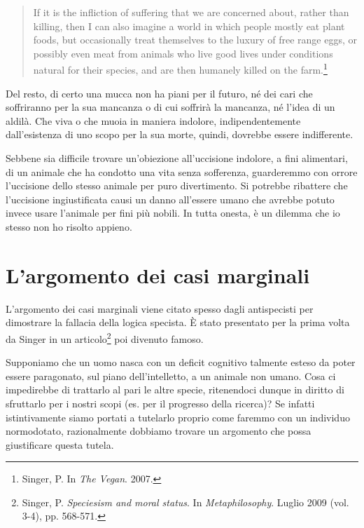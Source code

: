 \documentclass[a4paper,11pt,oneside,article]{memoir}
\begin{document}
\begin{quote}

If it is the infliction of suffering that we are concerned about, rather than
killing, then I can also imagine a world in which people mostly eat plant foods,
but occasionally treat themselves to the luxury of free range eggs, or possibly
even meat from animals who live good lives under conditions natural for their
species, and are then humanely killed on the farm.\footnote{Singer, P. In
\emph{The Vegan}. 2007.}

\end{quote}

Del resto, di certo una mucca non ha piani per il futuro, né dei cari che
soffriranno per la sua mancanza o di cui soffrirà la mancanza, né l'idea di un
aldilà. Che viva o che muoia in maniera indolore, indipendentemente
dall'esistenza di uno scopo per la sua morte, quindi, dovrebbe essere
indifferente.

Sebbene sia difficile trovare un'obiezione all'uccisione indolore, a fini
alimentari, di un animale che ha condotto una vita senza sofferenza, guarderemmo
con orrore l'uccisione dello stesso animale per puro divertimento. Si potrebbe
ribattere che l'uccisione ingiustificata causi un danno all'essere umano che
avrebbe potuto invece usare l'animale per fini più nobili. In tutta onesta, è un
dilemma che io stesso non ho risolto appieno.

\section{L'argomento dei casi marginali}

L'argomento dei casi marginali viene citato spesso dagli antispecisti per
dimostrare la fallacia della logica specista. È stato presentato per la prima
volta da Singer in un articolo\footnote{Singer, P. \emph{Speciesism and moral
status}. In \emph{Metaphilosophy}. Luglio 2009 (vol. 3-4), pp. 568-571.} poi divenuto
famoso.

Supponiamo che un uomo nasca con un deficit cognitivo talmente esteso da poter
essere paragonato, sul piano dell'intelletto, a un animale non umano. Cosa ci
impedirebbe di trattarlo al pari le altre specie, ritenendoci dunque in diritto
di sfruttarlo per i nostri scopi (es. per il progresso della ricerca)? Se
infatti istintivamente siamo portati a tutelarlo proprio come faremmo con un
individuo normodotato, razionalmente dobbiamo trovare un argomento che possa
giustificare questa tutela.
\end{document}
